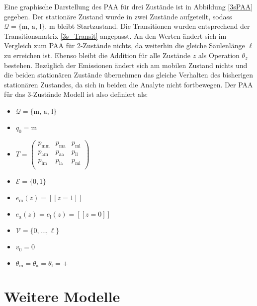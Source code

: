 Eine graphische Darstellung des PAA für drei Zustände ist in Abbildung \ref{3sPAA} gegeben. Der stationäre Zustand wurde in zwei Zustände aufgeteilt, sodass $\mathcal{Q} = \{\text{m, a, l}\}$. m bleibt Startzustand. Die Transitionen wurden entsprechend der Transitionsmatrix \ref{3s_Transit} angepasst. An den Werten ändert sich im Vergleich zum PAA für 2-Zustände nichts, da weiterhin die gleiche Säulenlänge $\ell$ zu erreichen ist. Ebenso bleibt die Addition für alle Zustände $z$ als Operation $\theta_z$ bestehen. Bezüglich der Emissionen ändert sich am mobilen Zustand nichts und die beiden stationären Zustände übernehmen das gleiche Verhalten des bisherigen stationären Zustandes, da sich in beiden die Analyte nicht fortbewegen.
Der PAA für das 3-Zustände Modell ist also definiert als:

\begin{itemize}
 \item $ \mathcal{Q} = \{\text{m, a, l}\}  $
 \item $  q_0 = \text{m} $
 \item $ T = \begin{pmatrix}
  p_{\text{mm}} & p_{\text{ma}} & p_{\text{ml}} \\
  p_{\text{am}} & p_{\text{aa}} & p_{\text{ll}} \\
  p_{\text{lm}} & p_{\text{la}} & p_{\text{ml}} \\
 \end{pmatrix} $
 \item $  \mathcal{E} = \{0, 1\} $
 \item $ e_{\text{m}}(z) = [\![ z=1 ]\!]$
 \item $  e_{\text{a}}(z) = e_{\text{l}}(z) = [\![ z=0 ]\!]$
 \item $  %
 \mathcal{V} = \{0, \ldots, \ell\} $
 \item $ v_0 = 0 $
 \item $  \theta_{\text{m}} = \theta_{\text{a}} = \theta_{\text{l}} = + $
\end{itemize}

\section{Weitere Modelle}

